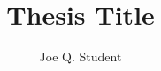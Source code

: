 \documentclass{kuthesis}
\title{%
  Thesis Title%
}
\author{Joe Q. Student}{Student, Joe Q.}
\begin{document}
\volume

\layout

\maketitle
\makedisclaimer
\makepreface







\appendices








\end{document}
